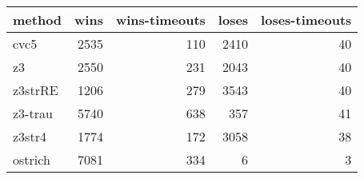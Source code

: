 \begin{tabular}{lrrrr}
\hline
 method   &   wins &   wins-timeouts &   loses &   loses-timeouts \\
\hline
 cvc5     &   2535 &             110 &    2410 &               40 \\
 z3       &   2550 &             231 &    2043 &               40 \\
 z3strRE  &   1206 &             279 &    3543 &               40 \\
 z3-trau  &   5740 &             638 &     357 &               41 \\
 z3str4   &   1774 &             172 &    3058 &               38 \\
 ostrich  &   7081 &             334 &       6 &                3 \\
\hline
\end{tabular}
